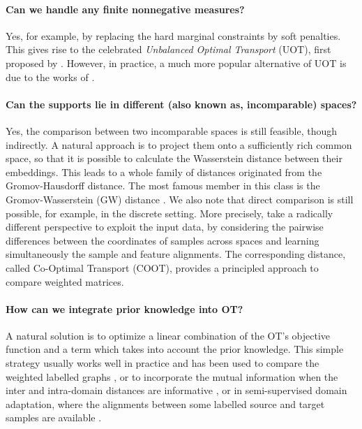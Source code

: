 \paragraph{Can we handle any finite nonnegative measures?} Yes, for example,
by replacing the hard marginal constraints by soft penalties.
This gives rise to the celebrated \textit{Unbalanced Optimal Transport} (UOT), first proposed by
\citet{Benamou03}. However, in practice, a much more popular alternative of UOT
is due to the works of \citet{Liero18,Frogner15}.

\paragraph{Can the supports lie in different (also known as, incomparable) spaces?}
Yes, the comparison between two incomparable spaces is still feasible, though indirectly.
A natural approach is to project them onto a sufficiently rich common space,
so that it is possible to calculate the Wasserstein distance between their embeddings.
This leads to a whole family of distances originated from the Gromov-Hausdorff distance.
The most famous member in this class is the Gromov-Wasserstein (GW) distance \citep{Memoli07,Memoli11}.
We also note that direct comparison is still possible, for example, in the discrete setting.
More precisely, \citet{Redko20} take a radically different perspective
to exploit the input data, by considering the pairwise differences between the coordinates
of samples across spaces and learning simultaneously the sample and feature alignments.
The corresponding distance, called Co-Optimal Transport (COOT),
provides a principled approach to compare weighted matrices.

\paragraph{How can we integrate prior knowledge into OT?} A natural solution is to optimize
a linear combination of the OT's objective function and a term which takes into account the
prior knowledge. This simple strategy usually works well in practice and has been used to
compare the weighted labelled graphs \citep{Vayer19b}, or to incorporate the mutual information
when the inter and intra-domain distances are informative \citep{Chuang23},
or in semi-supervised domain adaptation, where the alignments between some labelled source
and target samples are available \citep{Courty16,Gu22}.


